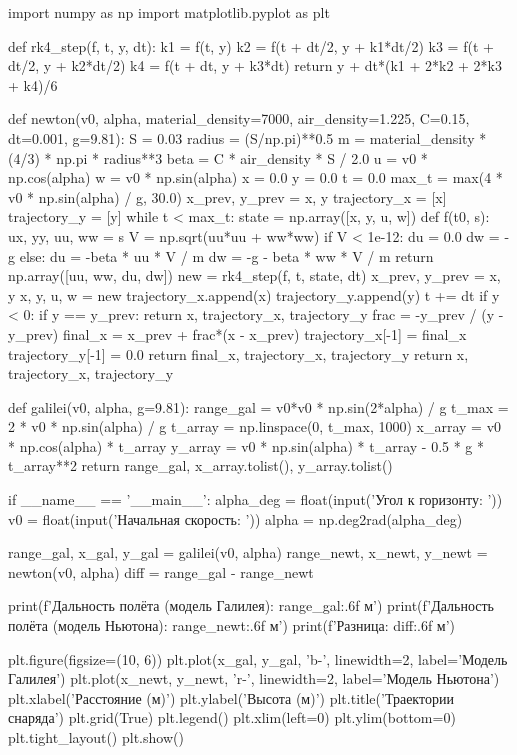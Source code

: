 \documentclass[a4paper, 14pt]{extarticle}
\begin{document}
\begin{breakablelisting}
import numpy as np
import matplotlib.pyplot as plt

def rk4_step(f, t, y, dt):
    k1 = f(t, y)
    k2 = f(t + dt/2, y + k1*dt/2)
    k3 = f(t + dt/2, y + k2*dt/2)
    k4 = f(t + dt, y + k3*dt)
    return y + dt*(k1 + 2*k2 + 2*k3 + k4)/6

def newton(v0, alpha, material_density=7000, air_density=1.225, C=0.15, dt=0.001, g=9.81):
    S = 0.03
    radius = (S/np.pi)**0.5
    m = material_density * (4/3) * np.pi * radius**3
    beta = C * air_density * S / 2.0
    u = v0 * np.cos(alpha)
    w = v0 * np.sin(alpha)
    x = 0.0
    y = 0.0
    t = 0.0
    max_t = max(4 * v0 * np.sin(alpha) / g, 30.0)
    x_prev, y_prev = x, y
    trajectory_x = [x]
    trajectory_y = [y]
    while t < max_t:
        state = np.array([x, y, u, w])
        def f(t0, s):
            ux, yy, uu, ww = s
            V = np.sqrt(uu*uu + ww*ww)
            if V < 1e-12:
                du = 0.0
                dw = -g
            else:
                du = -beta * uu * V / m
                dw = -g - beta * ww * V / m
            return np.array([uu, ww, du, dw])
        new = rk4_step(f, t, state, dt)
        x_prev, y_prev = x, y
        x, y, u, w = new
        trajectory_x.append(x)
        trajectory_y.append(y)
        t += dt
        if y < 0:
            if y == y_prev:
                return x, trajectory_x, trajectory_y
            frac = -y_prev / (y - y_prev)
            final_x = x_prev + frac*(x - x_prev)
            trajectory_x[-1] = final_x
            trajectory_y[-1] = 0.0
            return final_x, trajectory_x, trajectory_y
    return x, trajectory_x, trajectory_y

def galilei(v0, alpha, g=9.81):
    range_gal = v0*v0 * np.sin(2*alpha) / g
    t_max = 2 * v0 * np.sin(alpha) / g
    t_array = np.linspace(0, t_max, 1000)
    x_array = v0 * np.cos(alpha) * t_array
    y_array = v0 * np.sin(alpha) * t_array - 0.5 * g * t_array**2
    return range_gal, x_array.tolist(), y_array.tolist()

if __name__ == '__main__':
    alpha_deg = float(input('Угол к горизонту: '))
    v0 = float(input('Начальная скорость: '))
    alpha = np.deg2rad(alpha_deg)
    
    range_gal, x_gal, y_gal = galilei(v0, alpha)
    range_newt, x_newt, y_newt = newton(v0, alpha)
    diff = range_gal - range_newt
    
    print(f'Дальность полёта (модель Галилея): {range_gal:.6f} м')
    print(f'Дальность полёта (модель Ньютона): {range_newt:.6f} м')
    print(f'Разница: {diff:.6f} м')
    
    plt.figure(figsize=(10, 6))
    plt.plot(x_gal, y_gal, 'b-', linewidth=2, label='Модель Галилея')
    plt.plot(x_newt, y_newt, 'r-', linewidth=2, label='Модель Ньютона')
    plt.xlabel('Расстояние (м)')
    plt.ylabel('Высота (м)')
    plt.title('Траектории снаряда')
    plt.grid(True)
    plt.legend()
    plt.xlim(left=0)
    plt.ylim(bottom=0)
    plt.tight_layout()
    plt.show()
\end{breakablelisting}
\end{document}
